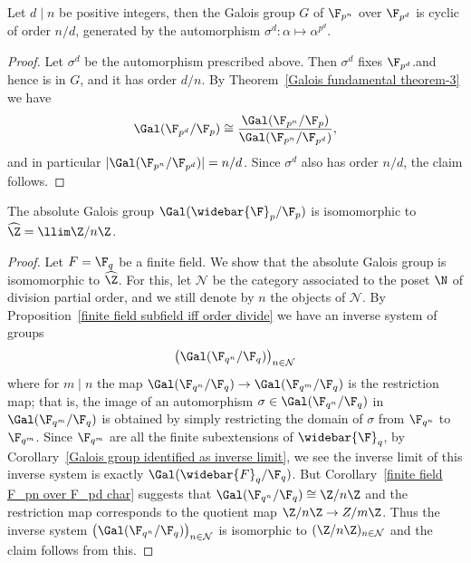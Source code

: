 \begin{corollary}\label{finite field F_pn over F_pd char}
Let $d\mid n$ be positive integers, then the Galois group $G$ of $\F_{p^n}$ over $\F_{p^d}$ is cyclic of order $n/d$, generated by the automorphism $\sigma^d:\alpha\mapsto\alpha^{p^d}$.
\end{corollary}
\begin{proof}
Let $\sigma^d$ be the automorphism prescribed above. Then $\sigma^d$ fixes $\F_{p^d}$.and hence is in $G$, and it has order $d/n$. By Theorem~\ref{Galois fundamental theorem-3} we have
\[\Gal(\F_{p^d}/\F_p)\cong\frac{\Gal(\F_{p^n}/\F_p)}{\Gal(\F_{p^n}/\F_{p^d})},\]
and in particular $|\Gal(\F_{p^n}/\F_{p^d})|=n/d$. Since $\sigma^{d}$ also has order $n/d$, the claim follows.
\end{proof}
\begin{corollary}\label{finite field F_p absolute Galois group char}
The absolute Galois group $\Gal(\widebar{\F}_p/\F_p)$ is isomomorphic to $\widehat{\Z}=\llim\Z/n\Z$.
\end{corollary}
\begin{proof}
Let $F=\F_q$ be a finite field. We show that the absolute Galois group is isomomorphic to $\widehat{\Z}$. For this, let $\mathcal{N}$ be the category associated to the poset $\N$ of division partial order, and we still denote by $n$ the objects of $\mathcal{N}$. By Proposition~\ref{finite field subfield iff order divide} we have an inverse system of groups
\[\big(\Gal(\F_{q^n}/\F_q)\big)_{n\in\mathcal{N}}\]
where for $m\mid n$ the map $\Gal(\F_{q^n}/\F_q)\to\Gal(\F_{q^m}/\F_q)$ is the restriction map; that is, the image of an automorphism $\sigma\in\Gal(\F_{q^n}/\F_q)$ in $\Gal(\F_{q^m}/\F_q)$ is obtained by simply restricting the domain of $\sigma$ from $\F_{q^n}$ to $\F_{q^m}$. Since $\F_{q^m}$ are all the finite subextensions of $\widebar{\F}_q$, by Corollary~\ref{Galois group identified as inverse limit}, we see the inverse limit of this inverse system is exactly $\Gal(\widebar{F}_q/\F_q)$. But Corollary~\ref{finite field F_pn over F_pd char} suggests that $\Gal(\F_{q^n}/\F_q)\cong\Z/n\Z$ and the restriction map corresponds to the quotient map $\Z/n\Z\to Z/m\Z$. Thus the inverse system $\big(\Gal(\F_{q^n}/\F_q)\big)_{n\in\mathcal{N}}$ is isomorphic to $(\Z/n\Z)_{n\in\mathcal{N}}$ and the claim follows from this.
\end{proof}
